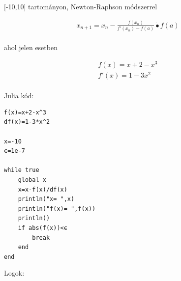 \documentclass{article}
\begin{document}
[-10,10] tartományon, Newton-Raphson módszerrel

\begin{multline}
x_{n+1} = x_n - \frac{f(x_n)}{f'(x_n)-f(a)} \dot{•} f(a)\\
\end{multline}

ahol jelen esetben

\begin{multline}
f(x) = x+2 - x^{3}\\
f'(x) = 1-3x^{2}\\
\end{multline}

Julia kód:

\begin{verbatim}
f(x)=x+2-x^3
df(x)=1-3*x^2

x=-10
ϵ=1e-7

while true
    global x
    x=x-f(x)/df(x)
    println("x= ",x)
    println("f(x)= ",f(x))
    println()
    if abs(f(x))<ϵ
        break
    end
end
\end{verbatim}

Logok:
\end{document}
